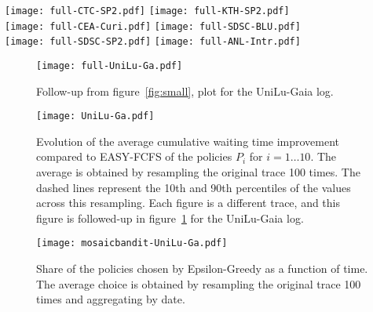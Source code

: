 \documentclass[sigconf]{acmart}
\begin{document}
\begin{figure*}[h]
  \centering
  \texttt{[image: full-CTC-SP2.pdf]}
  \texttt{[image: full-KTH-SP2.pdf]}\\
  \texttt{[image: full-CEA-Curi.pdf]}
  \texttt{[image: full-SDSC-BLU.pdf]}\\
  \texttt{[image: full-SDSC-SP2.pdf]}
  \texttt{[image: full-ANL-Intr.pdf]}

  \caption{Evolution of the average cumulative waiting time improvement
    compared to EASY-FCFS of the FullFeedback, NoisyFeedback and EpsilonGreedy
    policies. The average is obtained by resampling the original trace 100
    times. The dashed lines represent the 10th and 90th percentiles of the
  values across this resampling. Each figure is a different trace, and this
figure is followed-up in figure~\ref{fig:follow} for the UniLu-Gaia log.}

  \label{fig:small}
\end{figure*}

\begin{figure}[ht]
  \centering
  \texttt{[image: full-UniLu-Ga.pdf]}

  \caption{Follow-up from figure~\ref{fig:small}, plot for the UniLu-Gaia log.}

  \label{fig:follow}
\end{figure}

\begin{figure}[H]
  \centering
  \texttt{[image: UniLu-Ga.pdf]}

  \caption{Evolution of the average cumulative waiting time improvement
    compared to EASY-FCFS of the policies $P_i$ for $i = 1 \ldots 10$. The
    average is obtained by resampling the original trace 100 times. The dashed
    lines represent the 10th and 90th percentiles of the values across this
  resampling. Each figure is a different trace, and this figure is followed-up
in figure~\ref{fig:follow} for the UniLu-Gaia log.}

  \label{fig:all}
\end{figure}

\begin{figure}[H]
  \centering
  \texttt{[image: mosaicbandit-UniLu-Ga.pdf]}
  \caption{Share of the policies chosen by Epsilon-Greedy as a function of time.
  The average choice is obtained by resampling the original trace 100 times and
  aggregating by date.}
  \label{fig:mosb}
\end{figure}
\end{document}
